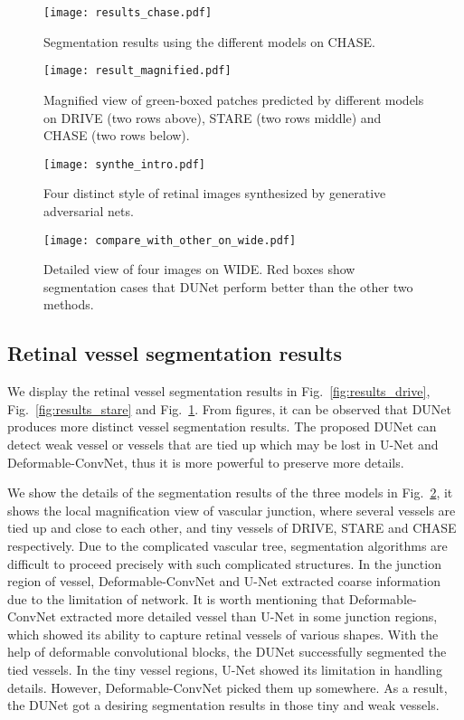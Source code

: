 \documentclass[journal]{IEEEtran}
\begin{document}
\begin{figure}
\centering
\texttt{[image: results\_chase.pdf]}
\caption{Segmentation results using the different models on CHASE.}
\label{fig:results_chase}
\end{figure}


\begin{figure}
\centering
\texttt{[image: result\_magnified.pdf]}
\caption{Magnified view of green-boxed patches predicted by different models on DRIVE (two rows above), STARE (two rows middle) and CHASE (two rows below).
}
\label{fig:result_magnified}
\end{figure}

\begin{figure}
\centering
\texttt{[image: synthe\_intro.pdf]}
\caption{Four distinct style of retinal images synthesized by generative adversarial nets.
}
\label{fig:synthe_intro}
\end{figure}

\begin{figure*}
\centering
\texttt{[image: compare\_with\_other\_on\_wide.pdf]}
\caption{Detailed view of four images on WIDE. Red boxes show segmentation cases that DUNet perform better than the other two methods.
}
\label{fig:compare_with_other_on_wide}
\end{figure*}


\subsection{Retinal vessel segmentation results}
We display the retinal vessel segmentation results in Fig.~\ref{fig:results_drive}, Fig.~\ref{fig:results_stare} and Fig.~\ref{fig:results_chase}. From figures, it can be observed that DUNet produces more distinct vessel segmentation results. The proposed DUNet can detect weak vessel or vessels that are tied up which may be lost in U-Net and Deformable-ConvNet, thus it is more powerful to preserve more details.



We show the details of the segmentation results of the three models in Fig.~\ref{fig:result_magnified}, it shows the local magnification view of vascular junction, where several vessels are tied up and close to each other, and tiny vessels of DRIVE, STARE and CHASE respectively. Due to the complicated vascular tree, segmentation algorithms are difficult to proceed precisely with such complicated structures. In the junction region of vessel, Deformable-ConvNet and U-Net extracted coarse information due to the limitation of network. It is worth mentioning that Deformable-ConvNet extracted more detailed vessel than U-Net in some junction regions, which showed its ability to capture retinal vessels of various shapes. With the help of deformable convolutional blocks, the DUNet successfully segmented the tied vessels. In the tiny vessel regions, U-Net showed its limitation in handling details. However, Deformable-ConvNet picked them up somewhere. As a result, the DUNet got a desiring segmentation results in those tiny and weak vessels.
\end{document}
